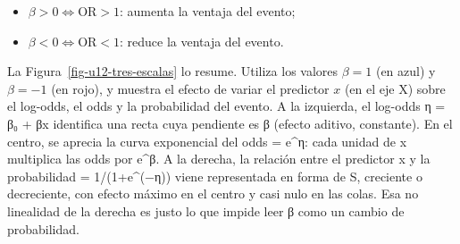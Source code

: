 \documentclass[
  letterpaper,
  DIV=11,
  numbers=noendperiod]{scrartcl}
\providecommand{\tightlist}{%
  \setlength{\itemsep}{0pt}\setlength{\parskip}{0pt}}\usepackage{longtable,booktabs,array}
\begin{document}
\begin{itemize}
\tightlist
\item
  \(\beta>0\Leftrightarrow\text{OR}>1\): aumenta la ventaja del evento;
\item
  \(\beta<0\Leftrightarrow\text{OR}<1\): reduce la ventaja del evento.
\end{itemize}

La Figura~\ref{fig-u12-tres-escalas} lo resume. Utiliza los valores
\(\beta=1\) (en azul) y \(\beta=-1\) (en rojo), y muestra el efecto de
variar el predictor \(x\) (en el eje X) sobre el log-odds, el odds y la
probabilidad del evento. A la izquierda, el log-odds η = β₀ + βx
identifica una recta cuya pendiente es β (efecto aditivo, constante). En
el centro, se aprecia la curva exponencial del odds = e\^{}η: cada
unidad de x multiplica las odds por e\^{}β. A la derecha, la relación
entre el predictor x y la probabilidad = 1/(1+e\^{}(−η)) viene
representada en forma de S, creciente o decreciente, con efecto máximo
en el centro y casi nulo en las colas. Esa no linealidad de la derecha
es justo lo que impide leer β como un cambio de probabilidad.
\end{document}
